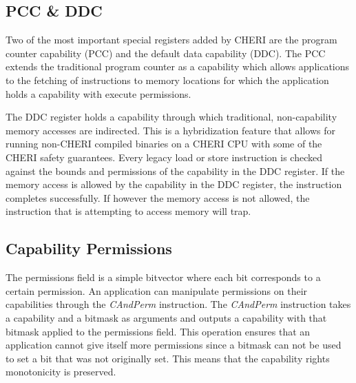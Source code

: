 \subsection{PCC \& DDC}
Two of the most important special registers added by CHERI are the program counter capability (PCC) and the default data capability (DDC). The PCC extends the traditional program counter as a capability which allows applications to the fetching of instructions to memory locations for which the application holds a capability with execute permissions.

The DDC register holds a capability through which traditional, non-capability memory accesses are indirected. This is a hybridization feature that allows for running non-CHERI compiled binaries on a CHERI CPU with some of the CHERI safety guarantees. Every legacy load or store instruction is checked against the bounds and permissions of the capability in the DDC register. If the memory access is allowed by the capability in the DDC register, the instruction completes successfully. If however the memory access is not allowed, the instruction that is attempting to access memory will trap.

\subsection{Capability Permissions}
\label{sec:capperms}
The permissions field is a simple bitvector where each bit corresponds to a certain permission. An application can manipulate permissions on their capabilities through the \textit{CAndPerm} instruction. The \textit{CAndPerm} instruction takes a capability and a bitmask as arguments and outputs a capability with that bitmask applied to the permissions field. This operation ensures that an application cannot give itself more permissions since a bitmask can not be used to set a bit that was not originally set. This means that the capability rights monotonicity is preserved.

